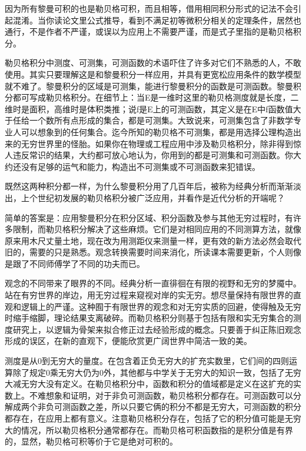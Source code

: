 因为所有黎曼可积的也是勒贝格可积，而且相等，借用相同积分形式的记法不会引起混淆。当你读论文里公式推导，看到不满足初等微积分相关的定理条件，居然也通行，不是作者不严谨，或误以为应用上不需要严谨，而是式子里指的是勒贝格积分。

勒贝格积分中测度、可测集，可测函数的术语吓住了许多对它们不熟悉的人，不敢使用。其实只要理解这是和黎曼积分一样应用，并具有更宽松应用条件的数学模型就不难了。黎曼积分的区域是可测集，能进行黎曼积分的函数是可测函数。黎曼积分都可写成勒贝格积分。在细节上：当E是一维时这里的勒贝格测度就是长度，二维时是面积，高维时是体积类推；说f是E上的可测函数，其定义是在E中f函数值大于任给一个数所有点形成的集合，都是可测集。大致说来，可测集包含了非数学专业人可以想象到的任何集合。迄今所知的勒贝格不可测集，都是用选择公理构造出来的无穷世界里的怪胎。如果你在物理或工程应用中涉及勒贝格积分，除非得到惊人违反常识的结果，大约都可放心地认为，你用到的都是可测集和可测函数。你大约还没有足够的运气和能力，构造出不可测集或不可测函数来犯错误。

既然这两种积分都一样，为什么黎曼积分用了几百年后，被称为经典分析而渐渐淡出，上个世纪初发展的勒贝格积分被广泛应用，并看作是近代分析的开端呢？

简单的答案是：应用黎曼积分在积分区域、积分函数及参与其他无穷过程时，有许多限制，而勒贝格积分解决了这些麻烦。它们是对相同应用的不同测算方法，就像原来用木尺丈量土地，现在改为用测距仪来测量一样，更有效的新方法必然会取代旧的，需要的只是熟悉。观念转换需要时间来消化，所读课本需要更新，个人则像是跟了不同师傅学了不同的功夫而已。

观念的不同带来了眼界的不同。经典分析一直徘徊在有限的视野和无穷的梦魇中。站在有穷世界的岸边，用无穷过程来窥视对岸的实无穷。想尽量保持有限世界的直观和逻辑上的严谨。这种囿于有限世界的观念和对无穷实质的回避，使得触及无穷时缩手缩脚，理论结果支离破碎。而勒贝格积分则基于包括有限和实无穷集合的测度研究上，以逻辑为骨架来拟合修正过去经验形成的概念。只要善于纠正陈旧观念形成的误区，在新的直观下，便能欣赏更广阔世界中简洁一致的美。

测度是从0到无穷大的量度。在包含着正负无穷大的扩充实数里，它们间的四则运算除了规定0乘无穷大仍为0外，其他都与中学关于无穷大的知识一致，包括了无穷大减无穷大没有定义。在勒贝格积分中，函数和积分的值域都是定义在这扩充的实数上。不难想象和证明，对于非负可测函数，勒贝格积分都存在。可测函数可以分解成两个非负可测函数之差，所以只要它俩的积分不都是无穷大，可测函数的积分都存在，在应用上都有意义。注意勒贝格积分存在，包括了它的积分值可能是无穷大的情况，所以勒贝格积分通常都存在。而勒贝格可积函数指的是积分值是有界的，显然，勒贝格可积等价于它是绝对可积的。

